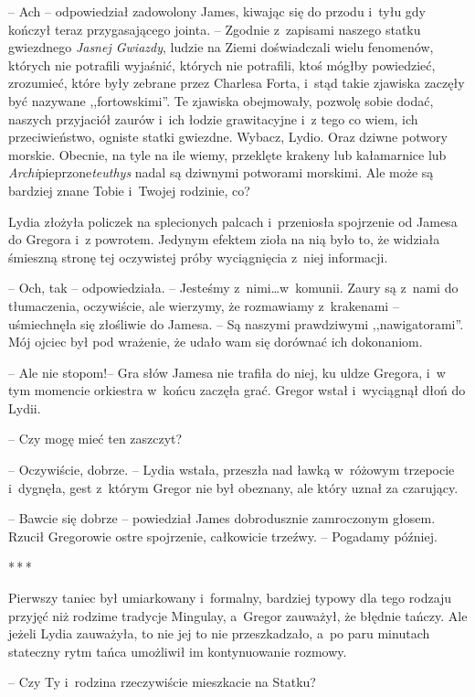 \documentclass[oneside,polish,12pt,sfheadings]{mwbk}
\newcommand{\threeast}{\bigskip\par\centerline{*\,*\,*}\medskip\par}%
\begin{document}
-- Ach -- odpowiedział zadowolony James, kiwając się do przodu i~tyłu gdy
kończył teraz przygasającego jointa. -- Zgodnie z~zapisami naszego statku
gwiezdnego \emph{Jasnej Gwiazdy}, ludzie na Ziemi doświadczali wielu
fenomenów, których nie potrafili wyjaśnić, których nie potrafili, ktoś
mógłby powiedzieć, zrozumieć, które były zebrane przez Charlesa Forta, i~stąd takie zjawiska zaczęły być nazywane ,,fortowskimi''. Te zjawiska
obejmowały, pozwolę sobie dodać, naszych przyjaciół zaurów i~ich łodzie
grawitacyjne i~z tego co wiem, ich przeciwieństwo, ogniste statki
gwiezdne. Wybacz, Lydio. Oraz dziwne potwory morskie. Obecnie, na tyle
na ile wiemy, przeklęte krakeny lub kałamarnice lub
\emph{Archi}pieprzone\emph{teuthys} nadal są dziwnymi potworami
morskimi. Ale może są bardziej znane Tobie i~Twojej rodzinie, co?

Lydia złożyła policzek na splecionych palcach i~przeniosła spojrzenie od
Jamesa do Gregora i~z powrotem. Jedynym efektem zioła na nią było to, że
widziała śmieszną stronę tej oczywistej próby wyciągnięcia z~niej
informacji.

-- Och, tak -- odpowiedziała. -- Jesteśmy z~nimi\ldots w~komunii. Zaury są z~nami do tłumaczenia, oczywiście, ale wierzymy, że rozmawiamy z~krakenami
-- uśmiechnęła się złośliwie do Jamesa. -- Są naszymi prawdziwymi
,,nawigatorami''. Mój ojciec był pod wrażenie, że udało wam się dorównać
ich dokonaniom.

-- Ale nie stopom!-- Gra słów Jamesa nie trafiła do niej, ku uldze
Gregora, i~w tym momencie orkiestra w~końcu zaczęła grać. Gregor wstał i~wyciągnął dłoń do Lydii.

-- Czy mogę mieć ten zaszczyt?

-- Oczywiście, dobrze. -- Lydia wstała, przeszła nad ławką w~różowym
trzepocie i~dygnęła, gest z~którym Gregor nie był obeznany, ale który
uznał za czarujący.

-- Bawcie się dobrze -- powiedział James dobrodusznie zamroczonym głosem.
Rzucił Gregorowie ostre spojrzenie, całkowicie trzeźwy. -- Pogadamy
później.

\threeast

Pierwszy taniec był umiarkowany i~formalny, bardziej typowy dla tego
rodzaju przyjęć niż rodzime tradycje Mingulay, a~Gregor zauważył, że
błędnie tańczy. Ale jeżeli Lydia zauważyła, to nie jej to nie
przeszkadzało, a~po paru minutach stateczny rytm tańca umożliwił im
kontynuowanie rozmowy.

-- Czy Ty i~rodzina rzeczywiście mieszkacie na Statku?
\end{document}
